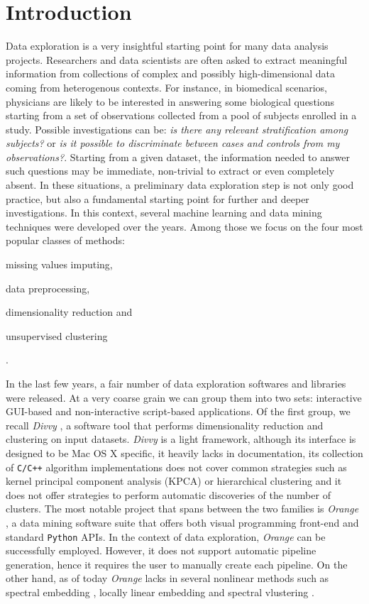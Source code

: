 \documentclass[twoside,11pt]{article}
\makeatletter
\newcommand{\py}{\texttt{Python}\@\xspace}
\makeatother
\begin{document}
\section{Introduction}\label{sec:intro}
Data exploration is a very insightful starting point for many data analysis projects. Researchers and data scientists are often asked to extract meaningful information from collections of complex and possibly high-dimensional data coming from heterogenous contexts. For instance, in biomedical scenarios, physicians are likely to be interested in answering some biological questions starting from a set of observations collected from a pool of subjects enrolled in a study. Possible investigations can be: \emph{is there any relevant stratification among subjects?} or \emph{is it possible to discriminate between cases and controls from my observations?}. Starting from a given dataset, the information needed to answer such questions may be immediate, non-trivial to extract or even completely absent.
In these situations, a preliminary data exploration step is not only good practice, but also a fundamental starting point for further and deeper investigations. In this context, several machine learning and data mining techniques were developed over the years. Among those we focus on the four most popular classes of methods: \begin{enumerate*}[label=(\roman*)]
  \item missing values imputing,
  \item data preprocessing,
  \item dimensionality reduction and
  \item unsupervised clustering
\end{enumerate*}.

In the last few years, a fair number of data exploration softwares and libraries  were released. At a very coarse grain we can group them into two sets: interactive GUI-based and non-interactive script-based  applications. Of the first group, we recall \emph{Divvy} \citep{lewis2013divvy}, a software tool that performs dimensionality reduction and clustering on input datasets. \emph{Divvy} is a light framework, although its interface is designed to be Mac OS X specific, it heavily lacks in documentation, its collection of \texttt{C/C++} algorithm implementations does not cover common strategies such as kernel principal component analysis (KPCA) \citep{scholkopf1997kernel} or hierarchical clustering \citep{friedman2001elements} and it does not offer strategies to perform automatic discoveries of the number of clusters. The most notable project that spans between the two families is \emph{Orange} \citep{demvsar2013orange}, a data mining software suite that offers both visual programming front-end and standard \py APIs. In the context of data exploration, \emph{Orange} can be successfully employed. However, it does not support automatic pipeline generation, hence it requires the user to manually create each pipeline. On the other hand, as of today \emph{Orange} lacks in several nonlinear methods such as spectral embedding \citep{ng2002spectral}, locally linear embedding \citep{roweis2000nonlinear} and spectral vlustering \citep{shi2000normalized}.
\end{document}
